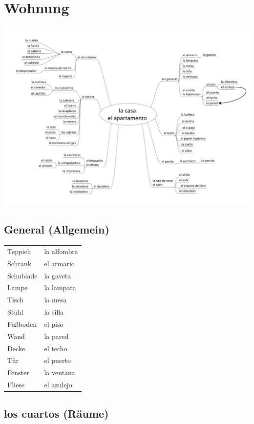 \documentclass{spanish_summary}
\begin{document}
\chapter*{Wohnung}
\begin{center}
  \includegraphics[scale=0.7]{casa.pdf}
\end{center}

\section*{General (Allgemein)}
\begin{longtable}{p{} p{}} 
  Teppich & la alfombra \\
  Schrank & el armario\\
  Schublade & la gaveta\\
  Lampe & la lampara\\
  Tisch & la mesa\\
  Stuhl & la silla\\
  Fußboden & el piso\\
  Wand & la pared\\
  Decke & el techo\\
  Tür & el puerto\\
  Fenster & la ventana\\
  Fliese & el azulejo\\
\end{longtable}

\section*{los cuartos (Räume)}
\end{document}
